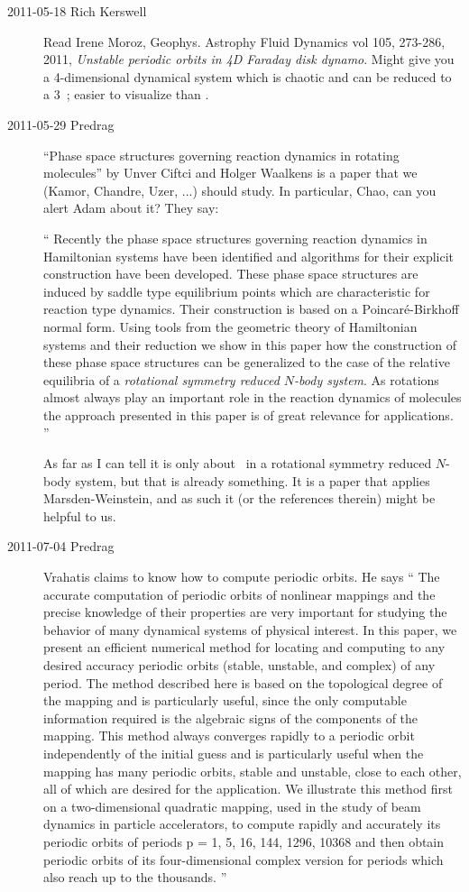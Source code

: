 \begin{description}
\item[2011-05-18  Rich Kerswell] Read
Irene Moroz,
Geophys. Astrophy Fluid Dynamics vol 105, 273-286, 2011,
\emph{Unstable periodic orbits in 4D Faraday disk dynamo}.
Might give you a 4-dimensional dynamical system which is
chaotic and can be reduced to a 3\dmn\ \statesp; easier to
visualize than {\cLf}.

\item[2011-05-29 Predrag]
{``Phase space structures} governing reaction dynamics in rotating molecules''
by Unver Ciftci and Holger Waalkens is a paper that we (Kamor, Chandre,
Uzer, ...) should study. In particular, Chao, can you alert Adam about
it? They say:

``
Recently the phase space structures governing reaction dynamics in
Hamiltonian systems have been identified and algorithms for their
explicit construction have been developed. These phase space structures
are induced by saddle type equilibrium points which are characteristic
for reaction type dynamics. Their construction is based on a
Poincar{\'e}-Birkhoff normal form. Using tools from the geometric theory
of Hamiltonian systems and their reduction we show in this paper how the
construction of these phase space structures can be generalized to the
case of the relative equilibria of a \emph{rotational symmetry reduced
$N$-body system}. As rotations almost always play an important role in
the reaction dynamics of molecules the approach presented in this paper
is of great relevance for applications.
''

As far as I can tell it is only about \reqva\ in a rotational symmetry
reduced $N$-body system, but that is already something. It is a paper
that applies Marsden-Weinstein, and as such it (or the references
therein) might be helpful to us.

\item[2011-07-04 Predrag]
Vrahatis claims to know how to compute periodic orbits. He says
``
The accurate computation of periodic orbits of nonlinear mappings and the
precise knowledge of their properties are very important for studying the
behavior of many dynamical systems of physical interest. In this paper,
we present an efficient numerical method for locating and computing to
any desired accuracy periodic orbits (stable, unstable, and complex) of
any period. The method described here is based on the topological degree
of the mapping and is particularly useful, since the only computable
information required is the algebraic signs of the components of the
mapping. This method always converges rapidly to a periodic orbit
independently of the initial guess and is particularly useful when the
mapping has many periodic orbits, stable and unstable, close to each
other, all of which are desired for the application. We illustrate this
method first on a two-dimensional quadratic mapping, used in the study of
beam dynamics in particle accelerators, to compute rapidly and accurately
its periodic orbits of periods p = 1, 5, 16, 144, 1296, 10368 and then
obtain periodic orbits of its four-dimensional complex version for
periods which also reach up to the thousands.
''


\end{description}
